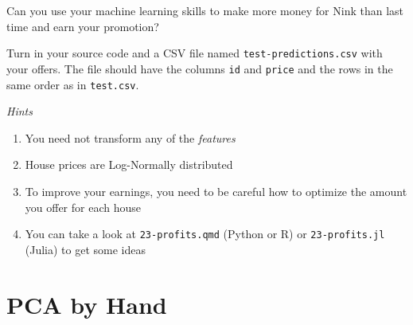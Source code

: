 \documentclass[letterpaper]{article}
\begin{document}
Can you use your machine learning skills to make more money for Nink than last time and earn your promotion?

Turn in your source code and a CSV file named \texttt{test-predictions.csv} with your offers. The file should have the columns \texttt{id} and \texttt{price} and the rows in the same order as in \texttt{test.csv}.

\emph{Hints}
\begin{enumerate}
\item You need not transform any of the \emph{features}
\item House prices are Log-Normally distributed
\item To improve your earnings, you need to be careful how to optimize the amount you offer for each house
\item You can take a look at \texttt{23-profits.qmd} (Python or R) or \texttt{23-profits.jl} (Julia) to get some ideas
\end{enumerate}


\section{PCA by Hand} \label{sec:pca-hand}
\end{document}
